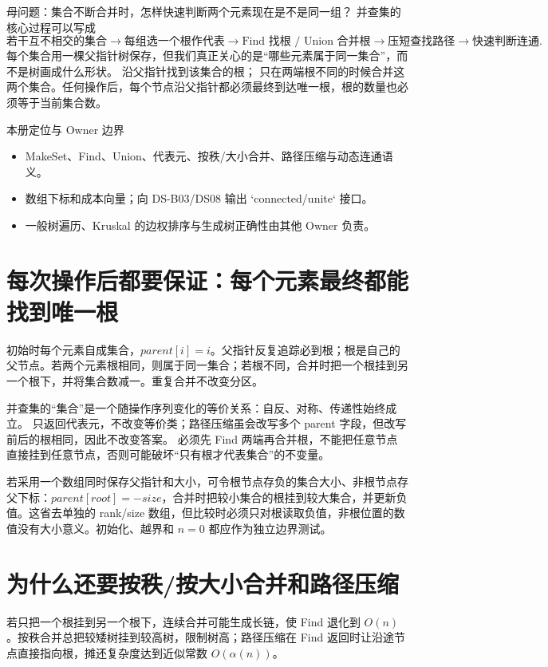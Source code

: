 \documentclass[UTF8,fontset=none,11pt,a4paper]{ctexart}
\begin{document}

\begin{corebox}{母问题：集合不断合并时，怎样快速判断两个元素现在是不是同一组？}
并查集的核心过程可以写成
\[
\text{若干互不相交的集合}\to\text{每组选一个根作代表}\to\text{Find 找根 / Union 合并根}\to\text{压短查找路径}\to\text{快速判断连通}.
\]
每个集合用一棵父指针树保存，但我们真正关心的是“哪些元素属于同一集合”，而不是树画成什么形状。 沿父指针找到该集合的根； 只在两端根不同的时候合并这两个集合。任何操作后，每个节点沿父指针都必须最终到达唯一根，根的数量也必须等于当前集合数。
\end{corebox}
\begin{methodbox}{本册定位与 Owner 边界}
\begin{itemize}
\item {}MakeSet、Find、Union、代表元、按秩/大小合并、路径压缩与动态连通语义。
\item {}数组下标和成本向量；向 DS-B03/DS08 输出 `connected/unite` 接口。
\item {}一般树遍历、Kruskal 的边权排序与生成树正确性由其他 Owner 负责。
\end{itemize}
\end{methodbox}
\tableofcontents\newpage

\section{每次操作后都要保证：每个元素最终都能找到唯一根}
初始时每个元素自成集合，$parent[i]=i$。父指针反复追踪必到根；根是自己的父节点。若两个元素根相同，则属于同一集合；若根不同，合并时把一个根挂到另一个根下，并将集合数减一。重复合并不改变分区。

并查集的“集合”是一个随操作序列变化的等价关系：自反、对称、传递性始终成立。 只返回代表元，不改变等价类；路径压缩虽会改写多个 parent 字段，但改写前后的根相同，因此不改变答案。 必须先 Find 两端再合并根，不能把任意节点直接挂到任意节点，否则可能破坏“只有根才代表集合”的不变量。

若采用一个数组同时保存父指针和大小，可令根节点存负的集合大小、非根节点存父下标：$parent[root]=-size$，合并时把较小集合的根挂到较大集合，并更新负值。这省去单独的 rank/size 数组，但比较时必须只对根读取负值，非根位置的数值没有大小意义。初始化、越界和 $n=0$ 都应作为独立边界测试。

\section{为什么还要按秩/按大小合并和路径压缩}
若只把一个根挂到另一个根下，连续合并可能生成长链，使 Find 退化到 $O(n)$。按秩合并总把较矮树挂到较高树，限制树高；路径压缩在 Find 返回时让沿途节点直接指向根，摊还复杂度达到近似常数 $O(\alpha(n))$。
\end{document}
